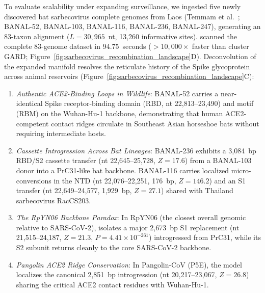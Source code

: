 To evaluate scalability under expanding surveillance, we ingested five newly discovered bat sarbecovirus complete genomes from Laos (Temmam et al.\ \cite{temmam2022bat}; BANAL-52, BANAL-103, BANAL-116, BANAL-236, BANAL-247), generating an 83-taxon alignment ($L = 30{,}965$~nt, 13,260 informative sites).
\RhizAeon scanned the complete 83-genome dataset in 94.75~seconds ($>10{,}000\times$ faster than cluster GARD; Figure~\ref{fig:sarbecovirus_recombination_landscape}D).
Deconvolution of the expanded manifold resolves the reticulate history of the Spike glycoprotein across animal reservoirs (Figure~\ref{fig:sarbecovirus_recombination_landscape}C):
\begin{enumerate}
    \item \textit{Authentic ACE2-Binding Loops in Wildlife}: BANAL-52 carries a near-identical Spike receptor-binding domain (RBD, nt 22,813--23,490) and motif (RBM) on the Wuhan-Hu-1 backbone, demonstrating that human ACE2-competent contact ridges circulate in Southeast Asian horseshoe bats without requiring intermediate hosts.
    \item \textit{Cassette Introgression Across Bat Lineages}: BANAL-236 exhibits a 3,084~bp RBD/S2 cassette transfer (nt 22,645--25,728, $Z = 17.6$) from a BANAL-103 donor into a PrC31-like bat backbone. BANAL-116 carries localized micro-conversions in the NTD (nt 22,076--22,251, 176~bp, $Z = 146.2$) and an S1 transfer (nt 22,649--24,577, 1,929~bp, $Z = 27.1$) shared with Thailand sarbecovirus RacCS203.
    \item \textit{The RpYN06 Backbone Paradox}: In RpYN06 (the closest overall genomic relative to SARS-CoV-2), \RhizAeon isolates a major 2,673~bp S1 replacement (nt 21,515--24,187, $Z = 21.3$, $P = 4.41 \times 10^{-261}$) introgressed from PrC31, while its S2 subunit returns cleanly to the core SARS-CoV-2 backbone.
    \item \textit{Pangolin ACE2 Ridge Conservation}: In Pangolin-CoV (P5E), the model localizes the canonical 2,851~bp introgression (nt 20,217--23,067, $Z = 26.8$) sharing the critical ACE2 contact residues with Wuhan-Hu-1.
\end{enumerate}

